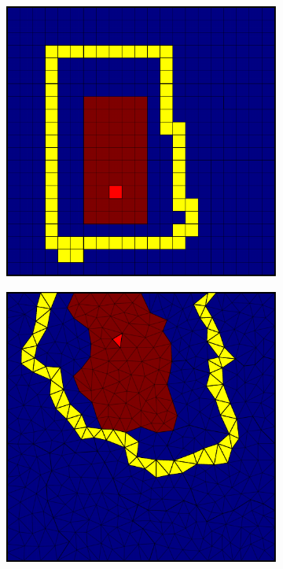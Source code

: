 \begin{figure}[htbp]
\begin{subfigure}[t]{0.3\textwidth}
  \end{subfigure}
  \hfill
  \begin{subfigure}[t]{0.3\textwidth}
    \centerline{\includegraphics[width=0.9\linewidth]{figs/square/square_cart_metis_cell_init}}
  \end{subfigure}
  \hfill
  \begin{subfigure}[t]{0.3\textwidth}
    \centerline{\includegraphics[width=0.9\linewidth]{figs/square/square_tria_metis_cell_init}}

\end{subfigure}
\end{figure}
